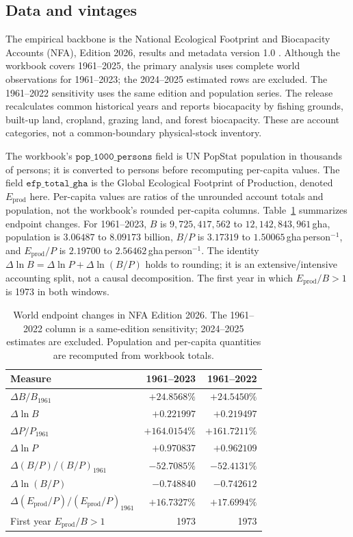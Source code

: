 \subsection{Data and vintages}\label{si:vintages}

The empirical backbone is the National Ecological Footprint and Biocapacity Accounts (NFA), Edition 2026, results and metadata version 1.0 \citep{Lo2026NFA}. Although the workbook covers 1961--2025, the primary analysis uses complete world observations for 1961--2023; the 2024--2025 estimated rows are excluded. The 1961--2022 sensitivity uses the same edition and population series. The release recalculates common historical years and reports biocapacity by fishing grounds, built-up land, cropland, grazing land, and forest biocapacity. These are account categories, not a common-boundary physical-stock inventory.

The workbook's $\texttt{pop\_1000\_persons}$ field is UN PopStat population in thousands of persons; it is converted to persons before recomputing per-capita values. The field $\texttt{efp\_total\_gha}$ is the Global Ecological Footprint of Production, denoted $E_{\mathrm{prod}}$ here. Per-capita values are ratios of the unrounded account totals and population, not the workbook's rounded per-capita columns. Table~\ref{tab:si_nfa_endpoints} summarizes endpoint changes. For 1961--2023, $B$ is $9{,}725{,}417{,}562$ to $12{,}142{,}843{,}961$\,gha, population is $3.06487$ to $8.09173$ billion, $B/P$ is $3.17319$ to $1.50065$\,gha\,person$^{-1}$, and $E_{\mathrm{prod}}/P$ is $2.19700$ to $2.56462$\,gha\,person$^{-1}$. The identity $\Delta\ln B=\Delta\ln P+\Delta\ln(B/P)$ holds to rounding; it is an extensive/intensive accounting split, not a causal decomposition. The first year in which $E_{\mathrm{prod}}/B>1$ is 1973 in both windows.

\begin{table}[htbp]
\centering\small
\caption{World endpoint changes in NFA Edition 2026. The 1961--2022 column is a same-edition sensitivity; 2024--2025 estimates are excluded. Population and per-capita quantities are recomputed from workbook totals.}
\label{tab:si_nfa_endpoints}
\begin{tabularx}{\textwidth}{>{\raggedright\arraybackslash}Xrr}
\toprule
Measure & 1961--2023 & 1961--2022 \\
\midrule
$\Delta B/B_{1961}$ & $+24.8568\%$ & $+24.5450\%$ \\
$\Delta\ln B$ & $+0.221997$ & $+0.219497$ \\
$\Delta P/P_{1961}$ & $+164.0154\%$ & $+161.7211\%$ \\
$\Delta\ln P$ & $+0.970837$ & $+0.962109$ \\
$\Delta(B/P)/(B/P)_{1961}$ & $-52.7085\%$ & $-52.4131\%$ \\
$\Delta\ln(B/P)$ & $-0.748840$ & $-0.742612$ \\
$\Delta(E_{\mathrm{prod}}/P)/(E_{\mathrm{prod}}/P)_{1961}$ & $+16.7327\%$ & $+17.6994\%$ \\
First year $E_{\mathrm{prod}}/B>1$ & 1973 & 1973 \\
\bottomrule
\end{tabularx}
\end{table}

